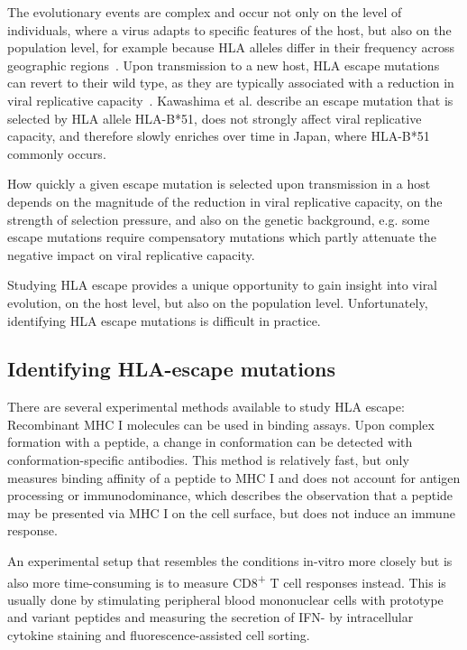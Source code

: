\documentclass[fleqn,11pt]{SelfArx} %
\begin{document}
The evolutionary events are complex and occur not only on the level of individuals, where a virus adapts to specific features of the host, but also on the population level, for example because HLA alleles differ in their frequency across geographic regions~\cite{Kawashima2009}. Upon transmission to a new host, HLA escape mutations can revert to their wild type, as they are typically associated with a reduction in viral replicative capacity~\cite{Matthews2008}. Kawashima et al. \nolinebreak\cite{Kawashima2009} describe an escape mutation that is selected by HLA allele HLA-B*51, does not strongly affect viral replicative capacity, and therefore slowly enriches over time in Japan, where HLA-B*51 commonly occurs.

How quickly a given escape mutation is selected upon transmission in a host depends on the magnitude of the reduction in viral replicative capacity, on the strength of selection pressure, and also on the genetic background, e.g. some escape mutations require compensatory mutations which partly attenuate the negative impact on viral replicative capacity.

Studying HLA escape provides a unique opportunity to gain insight into viral evolution, on the host level, but also on the population level.
Unfortunately, identifying HLA escape mutations is difficult in practice.

\subsection{Identifying HLA-escape mutations}

There are several experimental methods available to study HLA escape: Recombinant MHC I molecules can be used in binding assays. Upon complex formation with a peptide, a change in conformation can be detected with conformation-specific antibodies. This method is relatively fast, but only measures binding affinity of a peptide to MHC I and does not account for antigen processing or immunodominance, which describes the observation that a peptide may be presented via MHC I on the cell  surface, but does not induce an immune response.

An experimental setup that resembles the conditions in-vitro more closely but is also more time-consuming is to measure CD8\textsuperscript{+} T cell responses instead. This is usually done by stimulating peripheral blood mononuclear cells with prototype and variant peptides and measuring the secretion of IFN-\gamma{} by intracellular cytokine staining and fluorescence-assisted cell sorting.
\end{document}
